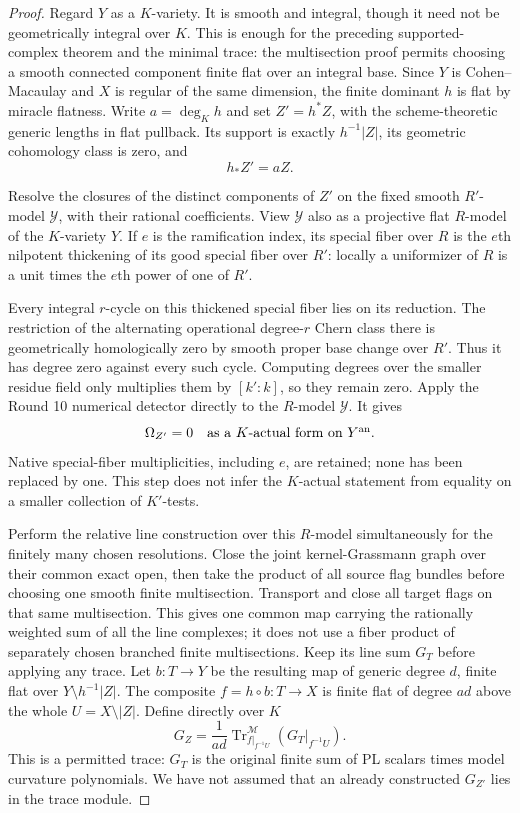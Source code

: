 \begin{proof}
Regard $Y$ as a $K$-variety.  It is smooth and integral, though it
need not be geometrically integral over $K$.  This is enough for
the preceding supported-complex theorem and the minimal trace:
the multisection proof permits choosing a smooth connected component
finite flat over an integral base.  Since $Y$ is Cohen--Macaulay
and $X$ is regular of the same dimension, the finite dominant $h$
is flat by miracle flatness.  Write $a=\deg_K h$ and set $Z'=h^*Z$,
with the scheme-theoretic generic lengths in flat pullback.
Its support is exactly $h^{-1}|Z|$, its geometric cohomology class
is zero, and
\[
                                  h_*Z'=aZ.
\tag{PC12}\label{r11p:finite-cover-cycle-degree}
\]

Resolve the closures of the distinct components of $Z'$ on the
fixed smooth $R'$-model $\mathcal Y$, with their rational
coefficients.  View $\mathcal Y$ also as a projective flat
$R$-model of the $K$-variety $Y$.  If $e$ is the ramification index,
its special fiber over $R$ is the $e$th nilpotent thickening of its
good special fiber over $R'$: locally a uniformizer of $R$ is a
unit times the $e$th power of one of $R'$.

Every integral $r$-cycle on this thickened special fiber lies on
its reduction.  The restriction of the alternating operational
degree-$r$ Chern class there is geometrically homologically zero
by smooth proper base change over $R'$.  Thus it has degree zero
against every such cycle.  Computing degrees over the smaller
residue field only multiplies them by $[k':k]$, so they remain zero.
Apply the Round 10 numerical detector directly to the $R$-model
$\mathcal Y$.  It gives
\[
              \Omega_{Z'}=0
                       \quad\hbox{as a $K$-actual form on $Y^{\rm an}$}.
\]
Native special-fiber multiplicities, including $e$, are retained;
none has been replaced by one.  This step does not infer the
$K$-actual statement from equality on a smaller collection of
$K'$-tests.

Perform the relative line construction over this $R$-model
simultaneously for the finitely many chosen resolutions.  Close the
joint kernel-Grassmann graph over their common exact open, then take
the product of all source flag bundles before choosing one smooth
finite multisection.  Transport and close all target flags on that
same multisection.  This gives one common map carrying the rationally
weighted sum of all the line complexes; it does not use a fiber
product of separately chosen branched finite multisections.
Keep its line sum $G_T$ before applying any trace.  Let $b:T\to Y$
be the resulting map of generic degree $d$, finite flat over
$Y\setminus h^{-1}|Z|$.  The composite
$f=h\circ b:T\to X$ is finite flat of degree $ad$ above the whole
$U=X\setminus|Z|$.  Define directly over $K$
\[
                   G_Z=\frac1{ad}
                       \operatorname{Tr}^{\mathscr M}_{f|_{f^{-1}U}}
                                      (G_T|_{f^{-1}U}).
\tag{PC13}\label{r11p:potential-good-formula}
\]
This is a permitted trace: $G_T$ is the original finite sum of
PL scalars times model curvature polynomials.  We have not assumed
that an already constructed $G_{Z'}$ lies in the trace module.


\end{proof}
